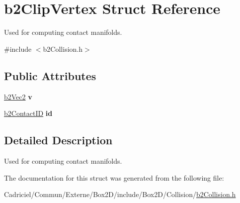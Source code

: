 \hypertarget{structb2_clip_vertex}{}\section{b2\+Clip\+Vertex Struct Reference}
\label{structb2_clip_vertex}


Used for computing contact manifolds.  




{\ttfamily \#include $<$b2\+Collision.\+h$>$}

\subsection*{Public Attributes}
\begin{DoxyCompactItemize}
\item 
\hyperlink{structb2_vec2}{b2\+Vec2} {\bfseries v}\hypertarget{structb2_clip_vertex_a6c8d8e4c0667755d5295a9c0d91d5b87}{}\label{structb2_clip_vertex_a6c8d8e4c0667755d5295a9c0d91d5b87}

\item 
\hyperlink{unionb2_contact_i_d}{b2\+Contact\+ID} {\bfseries id}\hypertarget{structb2_clip_vertex_ac0f6d48eafc40a665bc18d4aa821689d}{}\label{structb2_clip_vertex_ac0f6d48eafc40a665bc18d4aa821689d}

\end{DoxyCompactItemize}


\subsection{Detailed Description}
Used for computing contact manifolds. 

The documentation for this struct was generated from the following file\+:\begin{DoxyCompactItemize}
\item 
Cadriciel/\+Commun/\+Externe/\+Box2\+D/include/\+Box2\+D/\+Collision/\hyperlink{b2_collision_8h}{b2\+Collision.\+h}\end{DoxyCompactItemize}
